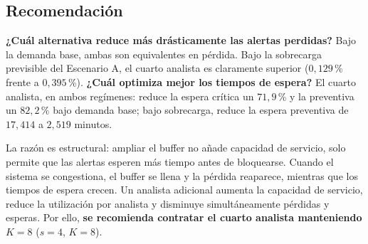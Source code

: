 \subsection{Recomendación}

\textbf{¿Cuál alternativa reduce más drásticamente las alertas perdidas?} Bajo
la demanda base, ambas son equivalentes en pérdida. Bajo la sobrecarga
previsible del Escenario A, el cuarto analista es claramente superior
($0{,}129$\,\% frente a $0{,}395$\,\%). \textbf{¿Cuál optimiza mejor los
tiempos de espera?} El cuarto analista, en ambos regímenes: reduce la espera
crítica un $71{,}9$\,\% y la preventiva un $82{,}2$\,\% bajo demanda base;
bajo sobrecarga, reduce la espera preventiva de $17{,}414$ a $2{,}519$ minutos.

La razón es estructural: ampliar el buffer no añade capacidad de servicio,
solo permite que las alertas esperen más tiempo antes de bloquearse. Cuando el
sistema se congestiona, el buffer se llena y la pérdida reaparece, mientras que
los tiempos de espera crecen. Un analista adicional aumenta la capacidad de
servicio, reduce la utilización por analista y disminuye simultáneamente
pérdidas y esperas. Por ello, \textbf{se recomienda contratar el cuarto
analista manteniendo $K=8$} ($s=4$, $K=8$).
